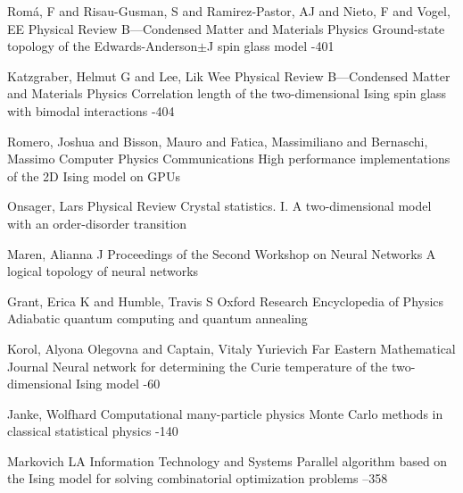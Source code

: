 \documentclass[10pt]{article}
\begin{document}
	
	
	\begin{thebibliography}{4}
		\setlength{\parsep}{0pt}\setlength{\itemsep}{3pt}
		
		\by Rom{\'a}, F and Risau-Gusman, S and Ramirez-Pastor, AJ and Nieto, F and Vogel, EE
		\jour Physical Review B—Condensed Matter and Materials Physics
		\paper Ground-state topology of the Edwards-Anderson$\pm$J spin glass model
		-401
		
		\by Katzgraber, Helmut G and Lee, Lik Wee
		\jour Physical Review B—Condensed Matter and Materials Physics
		\paper Correlation length of the two-dimensional Ising spin glass with bimodal interactions
		-404
		
		\by Romero, Joshua and Bisson, Mauro and Fatica, Massimiliano and Bernaschi, Massimo
		\jour Computer Physics Communications
		\paper High performance implementations of the 2D Ising model on GPUs
		
		\by Onsager, Lars
		\jour Physical Review
		\paper Crystal statistics. I. A two-dimensional model with an order-disorder transition
		
		\by Maren, Alianna J
		\jour Proceedings of the Second Workshop on Neural Networks
		\paper A logical topology of neural networks
		
		\by Grant, Erica K and Humble, Travis S
		\jour Oxford Research Encyclopedia of Physics
		\paper Adiabatic quantum computing and quantum annealing
		
		\by Korol, Alyona Olegovna and Captain, Vitaly Yurievich
		\jour Far Eastern Mathematical Journal
		\paper Neural network for determining the Curie temperature of the two-dimensional Ising model
		-60
		
		\by Janke, Wolfhard
		\jour Computational many-particle physics
		\paper Monte Carlo methods in classical statistical physics
		-140
		
		\by Markovich LA
		\jour Information Technology and Systems
		\paper Parallel algorithm based on the Ising model for solving combinatorial optimization problems
		--358
		

\end{thebibliography}
\end{document}
